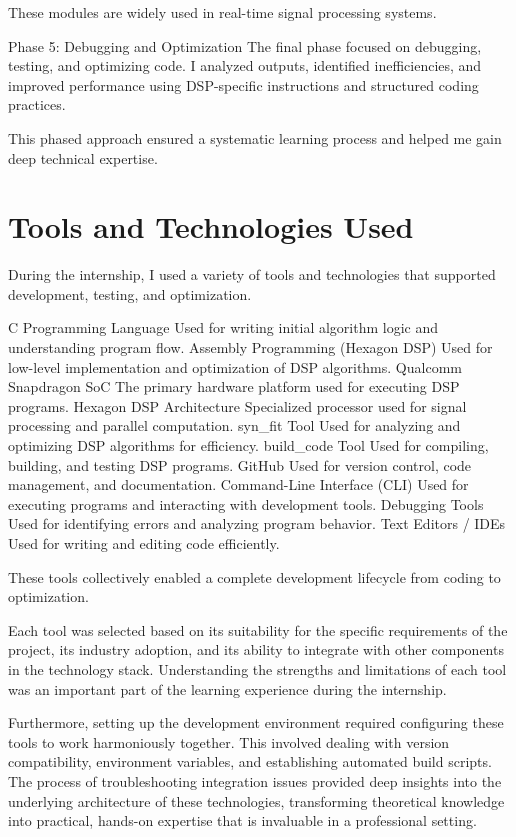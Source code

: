 \documentclass[12pt,a4paper]{report}
\begin{document}
These modules are widely used in real-time signal processing systems.


Phase 5: Debugging and Optimization The final phase focused on debugging, testing, and optimizing code. I analyzed outputs, identified inefficiencies, and improved performance using DSP-specific instructions and structured coding practices.


This phased approach ensured a systematic learning process and helped me gain deep technical expertise.


\section{Tools and Technologies Used}

During the internship, I used a variety of tools and technologies that supported development, testing, and optimization.


C Programming Language Used for writing initial algorithm logic and understanding program flow. Assembly Programming (Hexagon DSP) Used for low-level implementation and optimization of DSP algorithms. Qualcomm Snapdragon SoC The primary hardware platform used for executing DSP programs. Hexagon DSP Architecture Specialized processor used for signal processing and parallel computation. syn\_fit Tool Used for analyzing and optimizing DSP algorithms for efficiency. build\_code Tool Used for compiling, building, and testing DSP programs. GitHub Used for version control, code management, and documentation. Command-Line Interface (CLI) Used for executing programs and interacting with development tools. Debugging Tools Used for identifying errors and analyzing program behavior. Text Editors / IDEs Used for writing and editing code efficiently.


These tools collectively enabled a complete development lifecycle from coding to optimization.


Each tool was selected based on its suitability for the specific requirements of the project, its industry adoption, and its ability to integrate with other components in the technology stack. Understanding the strengths and limitations of each tool was an important part of the learning experience during the internship.


Furthermore, setting up the development environment required configuring these tools to work harmoniously together. This involved dealing with version compatibility, environment variables, and establishing automated build scripts. The process of troubleshooting integration issues provided deep insights into the underlying architecture of these technologies, transforming theoretical knowledge into practical, hands-on expertise that is invaluable in a professional setting.
\end{document}
